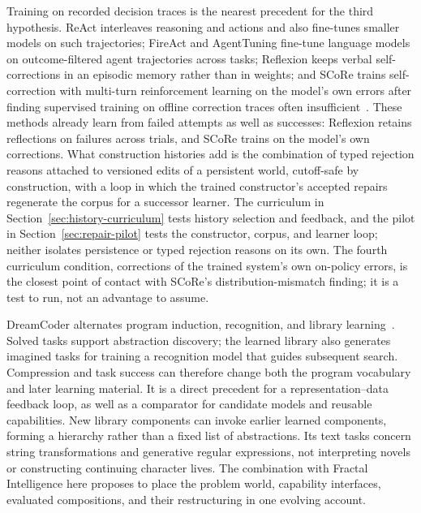 \documentclass[10pt]{article}
\begin{document}
Training on recorded decision traces is the nearest precedent for the third
hypothesis. ReAct interleaves reasoning and actions and also fine-tunes smaller
models on such trajectories; FireAct and AgentTuning fine-tune language models
on outcome-filtered agent trajectories across tasks; Reflexion keeps
verbal self-corrections in an episodic memory rather than in weights; and
SCoRe trains self-correction with multi-turn reinforcement learning on the
model's own errors after finding supervised training on offline correction
traces often
insufficient~\cite{yao2023react,chen2023fireact,zeng2023agenttuning,shinn2023reflexion,kumar2024selfcorrect}.
These methods already learn from failed attempts as well as successes:
Reflexion retains reflections on failures across trials, and SCoRe trains on
the model's own corrections. What construction histories add is the
combination of typed rejection reasons attached to versioned edits of a
persistent world, cutoff-safe by construction, with a loop in which the trained
constructor's accepted repairs regenerate the corpus for a successor learner.
The curriculum in Section~\ref{sec:history-curriculum} tests history selection
and feedback, and the pilot in Section~\ref{sec:repair-pilot} tests the
constructor, corpus, and learner loop; neither isolates persistence or typed
rejection reasons on its own. The fourth curriculum
condition, corrections of the trained system's own on-policy errors, is the
closest point of contact with SCoRe's distribution-mismatch finding; it is a
test to run, not an advantage to assume.

DreamCoder alternates program induction, recognition, and library
learning~\cite{ellis2021dreamcoder}. Solved tasks support abstraction discovery;
the learned library also generates imagined tasks for training a recognition
model that guides subsequent search. Compression and task success can therefore
change both the program vocabulary and later learning material. It is a direct
precedent for a representation--data feedback loop, as well as a comparator for
candidate models and reusable capabilities. New library components can invoke
earlier learned components, forming a hierarchy rather than a fixed list of
abstractions. Its text tasks concern string transformations and generative
regular expressions, not interpreting novels or constructing continuing
character lives. The combination with Fractal Intelligence here proposes
to place the problem world,
capability interfaces, evaluated compositions, and their restructuring in one
evolving account.
\end{document}
